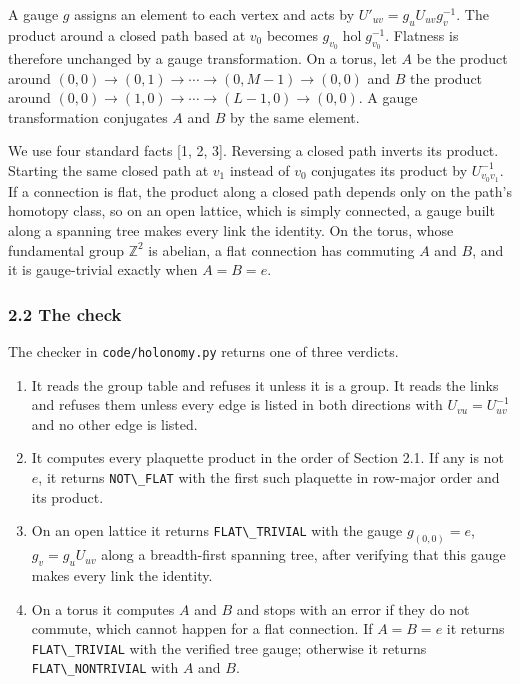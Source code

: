 \documentclass[
  11pt,
]{article}
\newcommand{\passthrough}[1]{#1}
\providecommand{\tightlist}{%
  \setlength{\itemsep}{0pt}\setlength{\parskip}{0pt}}
\begin{document}
A gauge \(g\) assigns an element to each vertex and acts by
\(U'_{uv} = g_u U_{uv} g_v^{-1}\). The product around a closed path
based at \(v_0\) becomes \(g_{v_0} \operatorname{hol} g_{v_0}^{-1}\).
Flatness is therefore unchanged by a gauge transformation. On a torus,
let \(A\) be the product around
\((0,0) \to (0,1) \to \cdots \to (0,M-1) \to (0,0)\) and \(B\) the
product around \((0,0) \to (1,0) \to \cdots \to (L-1,0) \to (0,0)\). A
gauge transformation conjugates \(A\) and \(B\) by the same element.

We use four standard facts {[}1, 2, 3{]}. Reversing a closed path
inverts its product. Starting the same closed path at \(v_1\) instead of
\(v_0\) conjugates its product by \(U_{v_0 v_1}^{-1}\). If a connection
is flat, the product along a closed path depends only on the path's
homotopy class, so on an open lattice, which is simply connected, a
gauge built along a spanning tree makes every link the identity. On the
torus, whose fundamental group \(\mathbb{Z}^2\) is abelian, a flat
connection has commuting \(A\) and \(B\), and it is gauge-trivial
exactly when \(A = B = e\).

\subsubsection{2.2 The check}\label{the-check}

The checker in \passthrough{\lstinline!code/holonomy.py!} returns one of
three verdicts.

\begin{enumerate}
\def\labelenumi{\arabic{enumi}.}
\tightlist
\item
  It reads the group table and refuses it unless it is a group. It reads
  the links and refuses them unless every edge is listed in both
  directions with \(U_{vu} = U_{uv}^{-1}\) and no other edge is listed.
\item
  It computes every plaquette product in the order of Section 2.1. If
  any is not \(e\), it returns \passthrough{\lstinline!NOT\_FLAT!} with
  the first such plaquette in row-major order and its product.
\item
  On an open lattice it returns \passthrough{\lstinline!FLAT\_TRIVIAL!}
  with the gauge \(g_{(0,0)} = e\), \(g_v = g_u U_{uv}\) along a
  breadth-first spanning tree, after verifying that this gauge makes
  every link the identity.
\item
  On a torus it computes \(A\) and \(B\) and stops with an error if they
  do not commute, which cannot happen for a flat connection. If
  \(A = B = e\) it returns \passthrough{\lstinline!FLAT\_TRIVIAL!} with
  the verified tree gauge; otherwise it returns
  \passthrough{\lstinline!FLAT\_NONTRIVIAL!} with \(A\) and \(B\).
\end{enumerate}
\end{document}
